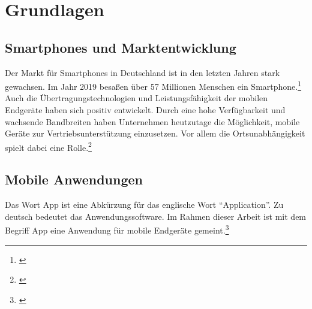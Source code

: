 \section{Grundlagen}

\subsection{Smartphones und Marktentwicklung}



Der Markt für Smartphones in Deutschland ist in den letzten Jahren stark gewachsen. Im Jahr 2019 besaßen über 57 Millionen Menschen ein Smartphone.\footnote{\cite[Vgl.][]{Statista2020}} Auch die Übertragungstechnologien und Leistungsfähigkeit der mobilen Endgeräte haben sich positiv entwickelt. Durch eine hohe Verfügbarkeit und wachsende Bandbreiten haben Unternehmen heutzutage die Möglichkeit, mobile Geräte zur Vertriebsunterstützung einzusetzen. Vor allem die Ortsunabhängigkeit spielt dabei eine Rolle.\footnote{\cite[Vgl.][231--239]{Schmitz2021}}

\subsection{Mobile Anwendungen}

Das Wort App ist eine Abkürzung für das englische Wort \enquote{Application}. Zu deutsch bedeutet das Anwendungssoftware. Im Rahmen dieser Arbeit ist mit dem Begriff App eine Anwendung für mobile Endgeräte gemeint.\footnote{\cite[Vgl.][82]{Kollmann2020}}


